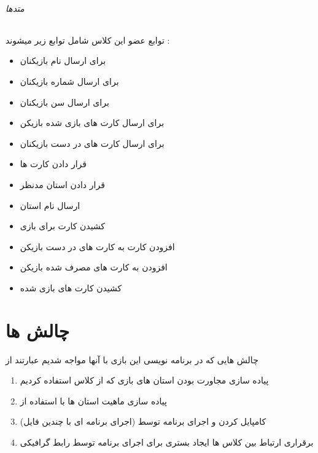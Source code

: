 \documentclass[pdf,titlepage,a4paper]{report}
\begin{document}
	\paragraph{متدها}
	توابع عضو این کلاس شامل توابع زیر میشوند :
	
	\begin{itemize}
		\item {} برای ارسال نام بازیکنان
		\item {} برای ارسال شماره بازیکنان
		\item {}  برای ارسال سن بازیکنان
		\item {} برای ارسال کارت های بازی شده بازیکن
		\item {} برای ارسال کارت های در دست بازیکنان
		\item {} قرار دادن کارت ها
		\item {} قرار دادن استان مدنظر
		\item {} ارسال نام استان
		\item {} کشیدن کارت برای بازی 
		\item {} افزودن کارت به کارت های در دست بازیکن
		\item {} افزودن به کارت های مصرف شده بازیکن
		\item {} کشیدن کارت های بازی شده
	\end{itemize}
	
	\newpage
	
	
	
	\part{چالش ها}
	
	چالش هایی که در برنامه نویسی این بازی با آنها مواجه شدیم عبارتند از 
	\begin{enumerate}
		\item	پیاده سازی مجاورت بودن استان های بازی که از کلاس   استفاده کردیم 
		\item پیاده سازی ماهیت استان ها با استفاده از  
		\item کامپایل کردن و اجرای برنامه توسط  (اجرای برنامه ای با چندین فایل)
    	\item برقراری ارتباط بین کلاس ها  ایجاد بستری برای اجرای برنامه توسط رابط گرافیکی 
	\end{enumerate}

	\newpage
		
\end{document}
